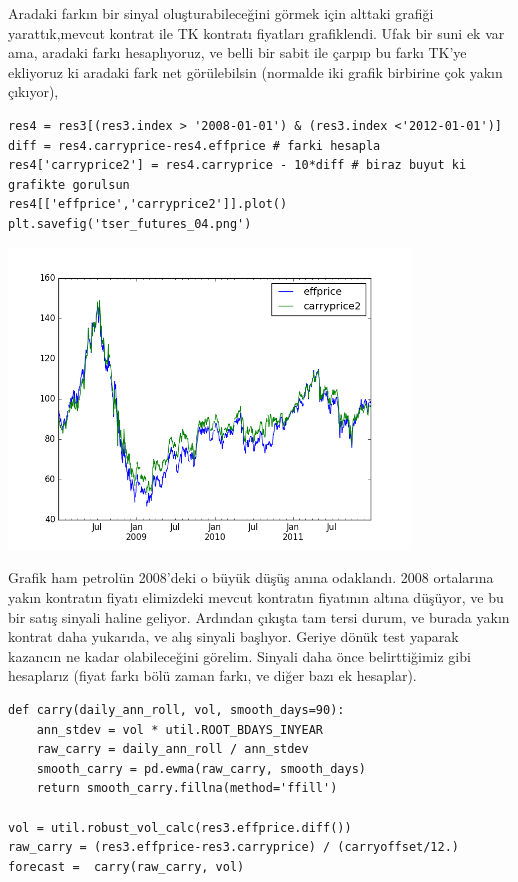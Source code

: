 \documentclass[12pt,fleqn]{article}\usepackage{../../common}
\begin{document}
Aradaki farkın bir sinyal oluşturabileceğini görmek için alttaki grafiği
yarattık,mevcut kontrat ile TK kontratı fiyatları grafiklendi. Ufak bir suni ek
var ama, aradaki farkı hesaplıyoruz, ve belli bir sabit ile çarpıp bu farkı
TK'ye ekliyoruz ki aradaki fark net görülebilsin (normalde iki grafik birbirine
çok yakın çıkıyor),

\begin{verbatim}
res4 = res3[(res3.index > '2008-01-01') & (res3.index <'2012-01-01')]
diff = res4.carryprice-res4.effprice # farki hesapla
res4['carryprice2'] = res4.carryprice - 10*diff # biraz buyut ki grafikte gorulsun
res4[['effprice','carryprice2']].plot()
plt.savefig('tser_futures_04.png')
\end{verbatim}

\includegraphics[height=8cm]{tser_futures_04.png}

Grafik ham petrolün 2008'deki o büyük düşüş anına odaklandı. 2008 ortalarına
yakın kontratın fiyatı elimizdeki mevcut kontratın fiyatının altına düşüyor, ve
bu bir satış sinyali haline geliyor. Ardından çıkışta tam tersi durum, ve burada
yakın kontrat daha yukarıda, ve alış sinyali başlıyor.  Geriye dönük test
yaparak kazancın ne kadar olabileceğini görelim. Sinyali daha önce belirttiğimiz
gibi hesaplarız (fiyat farkı bölü zaman farkı, ve diğer bazı ek hesaplar). 

\begin{verbatim}
def carry(daily_ann_roll, vol, smooth_days=90):
    ann_stdev = vol * util.ROOT_BDAYS_INYEAR
    raw_carry = daily_ann_roll / ann_stdev
    smooth_carry = pd.ewma(raw_carry, smooth_days)
    return smooth_carry.fillna(method='ffill')

vol = util.robust_vol_calc(res3.effprice.diff())
raw_carry = (res3.effprice-res3.carryprice) / (carryoffset/12.)
forecast =  carry(raw_carry, vol)
\end{verbatim}
\end{document}
